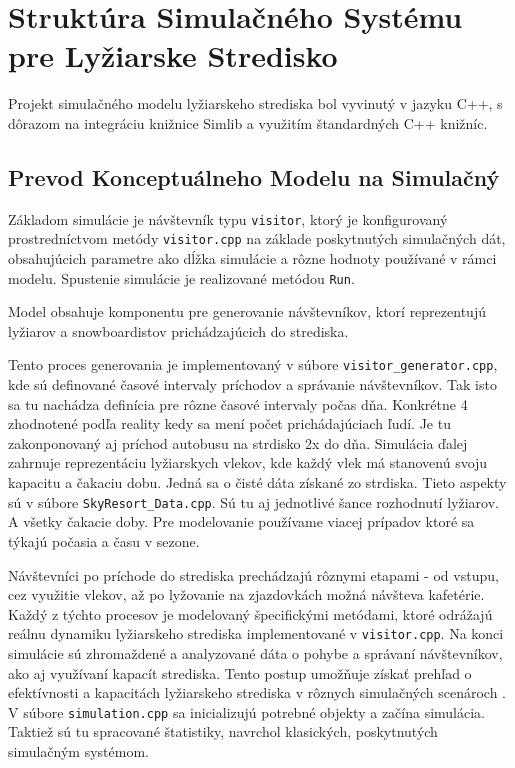 ﻿\section{Struktúra Simulačného Systému pre Lyžiarske Stredisko}
Projekt simulačného modelu lyžiarskeho strediska bol vyvinutý v jazyku C++, s dôrazom na integráciu knižnice Simlib a využitím štandardných C++ knižníc.
\subsection{Prevod Konceptuálneho Modelu na Simulačný}
Základom simulácie je návštevník typu \texttt{visitor}, ktorý je konfigurovaný prostredníctvom metódy \texttt{visitor.cpp} na základe poskytnutých simulačných dát, obsahujúcich parametre ako dĺžka simulácie a rôzne hodnoty používané v rámci modelu. Spustenie simulácie je realizované metódou \texttt{Run}.

Model obsahuje komponentu pre generovanie návštevníkov, ktorí reprezentujú lyžiarov a snowboardistov prichádzajúcich do strediska.

Tento proces generovania je implementovaný v súbore \texttt{visitor\_generator.cpp}, kde sú definované časové intervaly príchodov a správanie návštevníkov. 
Tak isto sa tu nachádza definícia pre rôzne časové intervaly počas dňa.  Konkrétne 4 zhodnotené podľa reality kedy sa mení počet prichádajúciach ľudí. 
Je tu zakonponovaný aj príchod autobusu na strdisko 2x do dňa. 
Simulácia ďalej zahrnuje reprezentáciu lyžiarskych vlekov, kde každý vlek má stanovenú svoju kapacitu a čakaciu dobu. Jedná sa o čisté dáta získané zo strdiska.
Tieto aspekty sú v súbore \texttt{SkyResort\_Data.cpp}. Sú tu aj jednotlivé šance rozhodnutí lyžiarov. A všetky čakacie doby. 
Pre modelovanie používame viacej prípadov ktoré sa týkajú počasia a času v sezone.

Návštevníci po príchode do strediska prechádzajú rôznymi etapami - od vstupu, cez využitie vlekov, až po lyžovanie na zjazdovkách možná návšteva kafetérie. Každý z týchto procesov je modelovaný špecifickými metódami, ktoré odrážajú reálnu dynamiku lyžiarskeho strediska implementované v \texttt{visitor.cpp}.
Na konci simulácie sú zhromaždené a analyzované dáta o pohybe a správaní návštevníkov, ako aj využívaní kapacít strediska. Tento postup umožňuje získať prehľad o efektívnosti a kapacitách lyžiarskeho strediska v rôznych simulačných scenároch .
V súbore \texttt{simulation.cpp} sa inicializujú potrebné objekty a začína simulácia. Taktiež sú tu spracované štatistiky, navrchol klasických, poskytnutých simulačným systémom.